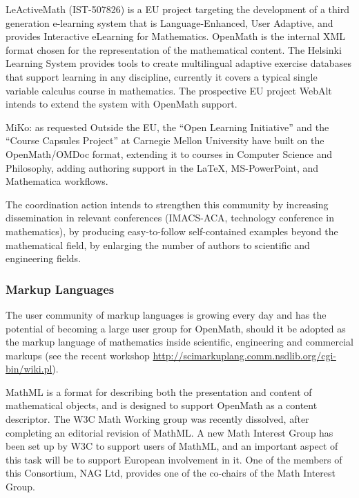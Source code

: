 \documentclass{euproposal}
\begin{document}
LeActiveMath (IST-507826) is a EU project targeting the development of
a third generation e-learning system that is Language-Enhanced, User
Adaptive, and provides Interactive eLearning for Mathematics. OpenMath
is the internal XML format chosen for the representation of the
mathematical content.  The Helsinki Learning System provides tools to
create multilingual adaptive exercise databases that support learning
in any discipline, currently it covers a typical single variable
calculus course in mathematics. The prospective EU project WebAlt
intends to extend the system with OpenMath support.

\begin{newpart}{MiKo: as requested}
  Outside the EU, the ``Open Learning Initiative'' and the ``Course Capsules
  Project'' at Carnegie Mellon University have built on the OpenMath/OMDoc format,
  extending it to courses in Computer Science and Philosophy, adding authoring
  support in the {\LaTeX}, MS-PowerPoint, and Mathematica workflows.
\end{newpart}

The coordination action intends to strengthen this community by
increasing dissemination in relevant conferences (IMACS-ACA,
technology conference in mathematics), by producing easy-to-follow
self-contained examples beyond the mathematical field, by enlarging
the number of authors to scientific and engineering fields.

\subsubsection{Markup Languages}\label{sec:ml}

The user community of markup languages is growing every day and has
the potential of becoming a large user group for OpenMath, should it
be adopted as the markup language of mathematics inside scientific,
engineering and commercial markups (see the recent workshop
\url{http://scimarkuplang.comm.nsdlib.org/cgi-bin/wiki.pl}).

MathML is a format for describing both the presentation and content of
mathematical objects, and is designed to support OpenMath as a content
descriptor.  The W3C Math Working group was recently dissolved, after
completing an editorial revision of MathML.  A new Math Interest Group
has been set up by W3C to support users of MathML, and an important
aspect of this task will be to support European involvement in it.
One of the members of this Consortium, NAG Ltd, provides one of the
co-chairs of the Math Interest Group.
\end{document}
